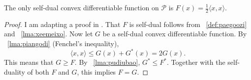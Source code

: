 \documentclass[12pt]{article}
\begin{document}

\begin{lemma}
  \label{lma:opheejai}
  The only self-dual convex differentiable function on $\mathcal{P}$
  is $F(x)=\frac{1}{2}\langle{}x,x\rangle$.
\end{lemma}
\begin{proof}
  \label{prf:vaegheiv}
  I am adapting a proof in . That $F$ is
  self-dual follows from {\efinition}~\ref{def:paegoozi} and
  {\emma}~\ref{lma:xeemeixo}. Now let $G$ be a self-dual convex
  differentiable function. By {\emma}~\ref{lma:piangodi} (Fenchel's
  inequality),
\begin{equation}
  \label{eq:oogoohei}
  \langle{}x,x\rangle\leq{}G(x)+G^{\ast}(x)=2G(x).
\end{equation}
This means that $G\geq{}F$. By {\emma}~\ref{lma:pudiubao},
$G^{\ast}\leq{}F^{\ast}$. Together with the self-duality of both $F$
and $G$, this implies $F=G$.
\end{proof}
\end{document}
